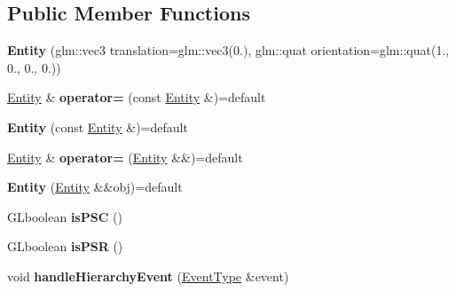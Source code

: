 \subsection*{Public Member Functions}
\begin{DoxyCompactItemize}
\item 
{\bfseries Entity} (glm\+::vec3 translation=glm\+::vec3(0.), glm\+::quat orientation=glm\+::quat(1., 0., 0., 0.))\hypertarget{classflw_1_1flf_1_1Entity_ae0bd5d55ad76477802d3976977060e67}{}\label{classflw_1_1flf_1_1Entity_ae0bd5d55ad76477802d3976977060e67}

\item 
\hyperlink{classflw_1_1flf_1_1Entity}{Entity} \& {\bfseries operator=} (const \hyperlink{classflw_1_1flf_1_1Entity}{Entity} \&)=default\hypertarget{classflw_1_1flf_1_1Entity_a87a30a1975aaa8ba7711357cb84ab4ea}{}\label{classflw_1_1flf_1_1Entity_a87a30a1975aaa8ba7711357cb84ab4ea}

\item 
{\bfseries Entity} (const \hyperlink{classflw_1_1flf_1_1Entity}{Entity} \&)=default\hypertarget{classflw_1_1flf_1_1Entity_aa8e3547b5d1b23198e95cf032c48cb85}{}\label{classflw_1_1flf_1_1Entity_aa8e3547b5d1b23198e95cf032c48cb85}

\item 
\hyperlink{classflw_1_1flf_1_1Entity}{Entity} \& {\bfseries operator=} (\hyperlink{classflw_1_1flf_1_1Entity}{Entity} \&\&)=default\hypertarget{classflw_1_1flf_1_1Entity_af1f43a2afb4ac8429d92c7e61a479ce0}{}\label{classflw_1_1flf_1_1Entity_af1f43a2afb4ac8429d92c7e61a479ce0}

\item 
{\bfseries Entity} (\hyperlink{classflw_1_1flf_1_1Entity}{Entity} \&\&obj)=default\hypertarget{classflw_1_1flf_1_1Entity_ab1f2f50ada8a35f1270423776b16201a}{}\label{classflw_1_1flf_1_1Entity_ab1f2f50ada8a35f1270423776b16201a}

\item 
G\+Lboolean {\bfseries is\+P\+SC} ()\hypertarget{classflw_1_1flf_1_1Entity_a2109cfa889dcd96c734e4068dfb4fcaa}{}\label{classflw_1_1flf_1_1Entity_a2109cfa889dcd96c734e4068dfb4fcaa}

\item 
G\+Lboolean {\bfseries is\+P\+SR} ()\hypertarget{classflw_1_1flf_1_1Entity_a475e8d05822681f76ebf21c0218ced53}{}\label{classflw_1_1flf_1_1Entity_a475e8d05822681f76ebf21c0218ced53}

\item 
void {\bfseries handle\+Hierarchy\+Event} (\hyperlink{classflw_1_1flf_1_1EventType}{Event\+Type} \&event)\hypertarget{classflw_1_1flf_1_1Entity_a6f237d03f2e2ff1fc58741c48649334e}{}\label{classflw_1_1flf_1_1Entity_a6f237d03f2e2ff1fc58741c48649334e}


\end{DoxyCompactItemize}
